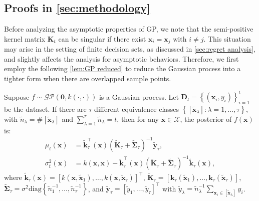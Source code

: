 \documentclass[11pt,en]{elegantpaper}
\newcommand{\domain}{\mathcal{X}}
\newcommand{\x}{\bm{x}}
\newcommand{\y}{\bm{y}}
\newcommand{\D}{\bm{D}}
\newcommand{\K}{\bm{K}}
\renewcommand{\k}{\bm{k}}
\newcommand{\1}{\mathds{1}}
\newcommand{\set}[1]{\left\{#1\right\}}
\newcommand{\diag}[1]{\mathrm{diag}\left\{#1\right\}}
\begin{document}
\subsection{Proofs in \texorpdfstring{\cref{sec:methodology}}{Section 3}}
\label{sec:proofs of asymptotic properties}

Before analyzing the asymptotic properties of GP, we note that the semi-positive kernel matrix $\K_t$ can be singular if there exist $\x_i = \x_j$ with $i \neq j$.
This situation may arise in the setting of finite decision sets, as discussed in \cref{sec:regret analysis}, and slightly affects the analysis for asymptotic behaviors.
Therefore, we first employ the following \cref{lem:GP reduced} to reduce the Gaussian process into a tighter form when there are overlapped sample points.


\begin{lemma}
    \label{lem:GP reduced}
    Suppose $f \sim \mathcal{GP}(\bm{0}, k(\cdot, \cdot))$ is a Gaussian process. Let $\D_t = \set{(\x_i, y_i)}_{i=1}^{t}$ be the dataset. If there are $\tau$ different equivalence classes $\set{[\tilde{\x}_{\lambda}] : \lambda = 1, \dots, \tau}$, with $\tilde{n}_{\lambda} = \#[\tilde{\x}_{\lambda}]$ and $\sum_{\lambda=1}^{\tau} \tilde{n}_{\lambda} = t$, then for any $\x \in \domain$, the posterior of $f(\x)$ is:
    \begin{align}
        \mu_t(\x) 
        & = \tilde{\k}_{\tau}^{\top}(\x) (\tilde{\K}_{\tau} + \tilde{\bm{\Sigma}}_{\tau})^{-1} \tilde{\y}_{\tau}, 
        \\
        \sigma^2_t(\x) 
        & = k(\x, \x) - \tilde{\k}_{\tau}^{\top}(\x) (\tilde{\K}_{\tau} + \tilde{\bm{\Sigma}}_{\tau})^{-1} \tilde{\k}_{\tau}(\x),
    \end{align}
    where $\tilde{\k}_{\tau}(\x) = [k(\x, \tilde{\x}_1), \dots, k(\x, \tilde{\x}_{\tau})]^{\top}$, $\tilde{\K}_{\tau} = [\k_{\tau}(\tilde{\x}_1), \dots, \k_{\tau}(\tilde{\x}_{\tau})]$, $\tilde{\bm{\Sigma}}_{\tau} = \sigma^2 \diag{\tilde{n}_1^{-1}, \dots, \tilde{n}_{\tau}^{-1}}$, and $\tilde{\y}_{\tau} = [\tilde{y}_1, \dots, \tilde{y}_{\tau}]^{\top}$ with $\tilde{y}_{\lambda} = \tilde{n}_{\lambda}^{-1} \sum_{\x_i \in [\tilde{\x}_{\lambda}]} y_i$.
\end{lemma}
\end{document}
